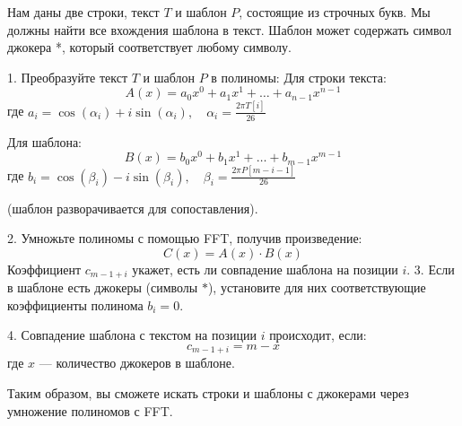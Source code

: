 Нам даны две строки, текст $T$ и шаблон $P$, состоящие из строчных букв. Мы должны найти все вхождения шаблона в текст.
Шаблон может содержать символ джокера *, который соответствует любому символу.

1. Преобразуйте текст $T$ и шаблон $P$ в полиномы:
   Для строки текста:
   \[ A(x) = a_0 x^0 + a_1 x^1 + \dots + a_{n-1} x^{n-1} \]
   где \( a_i = \cos(\alpha_i) + i \sin(\alpha_i), \quad \alpha_i = \frac{2 \pi T[i]}{26} \)
   
   Для шаблона:
   \[ B(x) = b_0 x^0 + b_1 x^1 + \dots + b_{m-1} x^{m-1} \]
   где \( b_i = \cos(\beta_i) - i \sin(\beta_i), \quad \beta_i = \frac{2 \pi P[m-i-1]}{26} \)
   
   (шаблон разворачивается для сопоставления).

2. Умножьте полиномы с помощью FFT, получив произведение:
   \[ C(x) = A(x) \cdot B(x) \]
   Коэффициент \( c_{m-1+i} \) укажет, есть ли совпадение шаблона на позиции \( i \).
3. Если в шаблоне есть джокеры (символы $*$), установите для них соответствующие коэффициенты полинома \( b_i = 0 \).

4. Совпадение шаблона с текстом на позиции \( i \) происходит, если:
   \[ c_{m-1+i} = m - x \]
   где \( x \) — количество джокеров в шаблоне.

Таким образом, вы сможете искать строки и шаблоны с джокерами через умножение полиномов с FFT.